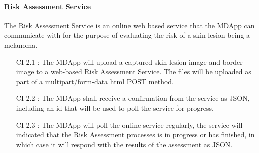     \paragraph{Risk Assessment Service }

        The Risk Assessment Service is an online web based service that the MDApp can communicate with for the purpose of evaluating the risk of a skin lesion being a melanoma.

        \begin{itemize}[leftmargin=1.4cm]
            \item[CI-2.1 :] The MDApp will upload a captured skin lesion image and border image to a web-based Risk Assessment Service. The files will be uploaded as part of a multipart/form-data html POST method.
            \item[CI-2.2 :] The MDApp shall receive a confirmation from the service as JSON, including an id that will be used to poll the service for progress.
            \item[CI-2.3 :] The MDApp will poll the online service regularly, the service will indicated that the Risk Assessment processes is in progress or has finished, in which case it will respond with the results of the assessment as JSON.

        \end{itemize}